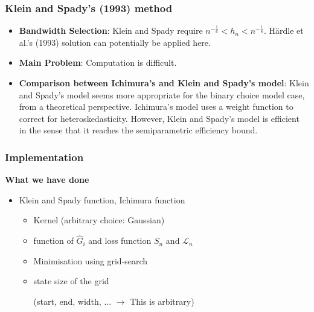 \documentclass{beamer}
\begin{document}
\begin{frame}
\frametitle{Klein and Spady's (1993) method}
\begin{itemize}
	\setlength\itemsep{1.5em}

	\item \textbf{Bandwidth Selection}: Klein and Spady require $ n^{-\frac{1}{6}} < h_n < n^{-\frac{1}{8}}$. H{\"a}rdle et al.'s (1993) solution can potentially be applied here.
	

	\item \textbf{Main Problem}: Computation is difficult.
	
	
	\item \textbf{Comparison between Ichimura's and Klein and Spady's model}:
	Klein and Spady's model seems more appropriate for the binary choice model case, from a theoretical perspective. Ichimura's model uses a weight function to correct for heteroskedasticity. However, Klein and Spady's model is efficient in the sense that it reaches the semiparametric efficiency bound.
	
\end{itemize}
\end{frame}

\begin{frame}[t]
	\frametitle{Implementation}

	\textbf{What we have done}
	\begin{itemize}
		\item Klein and Spady function, Ichimura function 
		\begin{itemize}\item Kernel (arbitrary choice: Gaussian) 
			\item function of $\hat{G}_{i}$ and loss function $S_n$ and $\mathcal{L}_n$
			\item Minimisation using grid-search  
			      \item state size of the grid \\
				\begin{center}(start, end, width, ... $\rightarrow$ This is arbitrary) 
				\end{center} 
		\end{itemize}
	\end{itemize}
	\note{~}
\end{frame}
\end{document}
